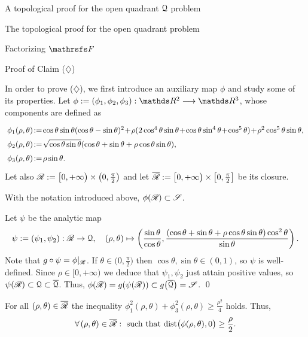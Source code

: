 \documentclass[11pt, a4paper, english, twoside, notitlepage, openright]{report}
\begin{document}
\begin{chapter}{A topological proof for the open quadrant $\mathcal{Q}$ problem}
\begin{section}{The topological proof for the open quadrant problem}
\begin{subsection}{Factorizing $\FFF$}
\end{subsection}

\begin{subsection}{Proof of Claim ($\diamondsuit$)}\label{mainsubsectop}

In order to prove ($\diamondsuit$), we first introduce an auxiliary map $\phi$ and study some of its properties. Let $\phi:=(\phi_1,\phi_2,\phi_3):\R^2\longrightarrow\R^3$, whose components are defined as
$$
\arraycolsep=2pt\def\arraystretch{1.5}
\begin{array}{l}
\phi_1(\rho,\theta)\!:=\!\cos\theta\sin\theta(\cos\theta-
\sin\theta)^2\!+\!\rho(2\cos^4\theta\sin\theta\!+\!\cos\theta\sin^4\theta\!+\!\cos^5\theta)\!+\!\rho^2\cos^5\theta\sin\theta,\\
\phi_2(\rho,\theta)\!:=\!\sqrt{\cos\theta\sin\theta}(\cos\theta+\sin\theta+\rho\cos\theta\sin\theta),\\
\phi_3(\rho,\theta)\!:=\!\rho\sin\theta.
\end{array}
$$
Let also $\mathscr{R}:=\big[0,+\infty\big)\times\big(0,\tfrac{\pi}{2}\big)$ and let $\overline{\mathscr{R}}:=\big[0,+\infty\big)\times\big[0,\tfrac{\pi}{2}\big]$ be its closure.

\vspace{1mm}

\begin{lemma}\label{phiContainsS}
With the notation introduced above, $\phi(\mathscr{R})\subset\mathscr{S}$.
\begin{Proof}
Let $\psi$ be the analytic map
$$
\psi:=(\psi_1,\psi_2):\mathscr{R}\to\mathcal{Q},\quad(\rho,\theta)\mapsto\left(\frac{\sin\theta}{\cos\theta},\frac{(\cos\theta+\sin\theta+\rho\cos\theta
\sin\theta)\cos^2\theta}{\sin\theta}\right).
$$
Note that $g\circ\psi=\phi|_{\mathscr{R}}$. If $\theta\in\big(0,\tfrac{\pi}{2}\big)$ then $\cos\theta,\sin\theta\in(0,1)$, so $\psi$ is well-defined. Since $\rho\in[0,+\infty)$ we deduce that $\psi_1,\psi_2$ just attain positive values, so $\psi(\mathscr{R})\subset \mathcal{Q}\subset \overline{\mathcal{Q}}$. Thus, $\phi({\mathscr{R}})=g(\psi(\mathscr{R}))\subset g\big(\overline{\mathcal{Q}}\big)=\mathscr{S}$.
\qed
\end{Proof}
\end{lemma}

\vspace{1mm}

\begin{lemma}\label{phidist}
For all $(\rho,\theta)\in\overline{\mathscr{R}}$ the inequality $\phi_1^2(\rho,\theta)+\phi_3^2(\rho,\theta)\ge\frac{\rho^2}{4}$ holds. Thus,
\begin{equation}\label{eq:ineqphi}
\forall (\rho,\theta)\in\overline{\Rr}:\  \text{such that dist}\big(\phi(\rho,\theta),0\big)\geq\frac{\rho}{2}.
\end{equation}


\end{lemma}
\end{subsection}
\end{section}
\end{chapter}
\end{document}
